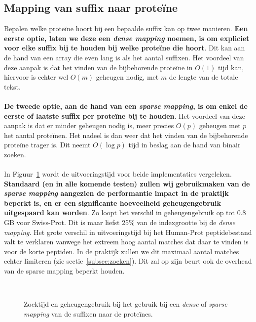 \subsection{Mapping van suffix naar proteïne}\label{subsec:mapping-van-suffix-naar-proteine}
Bepalen welke proteïne hoort bij een bepaalde suffix kan op twee manieren.
\textbf{Een eerste optie, laten we deze een \textit{dense mapping} noemen, is om expliciet voor elke suffix bij te houden bij welke proteïne die hoort}.
Dit kan aan de hand van een array die even lang is als het aantal suffixen.
Het voordeel van deze aanpak is dat het vinden van de bijbehorende proteïne in $O(1)$ tijd kan, hiervoor is echter wel $O(m)$ geheugen nodig, met $m$ de lengte van de totale tekst.
\\ \\
\textbf{De tweede optie, aan de hand van een \textit{sparse mapping}, is om enkel de eerste of laatste suffix per proteïne bij te houden}.
Het voordeel van deze aanpak is dat er minder geheugen nodig is, meer precies $O(p)$ geheugen met $p$ het aantal proteïnen.
Het nadeel is dan weer dat het vinden van de bijbehorende proteïne trager is.
Dit neemt $O(\log p)$ tijd in beslag aan de hand van binair zoeken.
\\ \\
In Figuur~\ref{fig:dense_vs_sparse} wordt de uitvoeringstijd voor beide implementaties vergeleken.
\textbf{Standaard (en in alle komende testen) zullen wij gebruikmaken van de \textit{sparse mapping} aangezien de performantie impact in de praktijk beperkt is, en er een significante hoeveelheid geheugengebruik uitgespaard kan worden}.
Zo loopt het verschil in geheugengebruik op tot 0.8 GB voor Swiss-Prot.
Dit is maar liefst 25\% van de indexgrootte bij de \textit{dense mapping}.
Het grote verschil in uitvoeringstijd bij het Human-Prot peptidebestand valt te verklaren vanwege het extreem hoog aantal matches dat daar te vinden is voor de korte peptiden.
In de praktijk zullen we dit maximaal aantal matches echter limiteren (zie sectie~\ref{subsec:zoeken}).
Dit zal op zijn beurt ook de overhead van de sparse mapping beperkt houden.
\begin{figure}[H]
    \centering
    \\[4ex] %
    \centering
    \caption{Zoektijd en geheugengebruik bij het gebruik bij een \textit{dense} of \textit{sparse mapping} van de suffixen naar de proteïnes.}\label{fig:dense_vs_sparse}
\end{figure}

